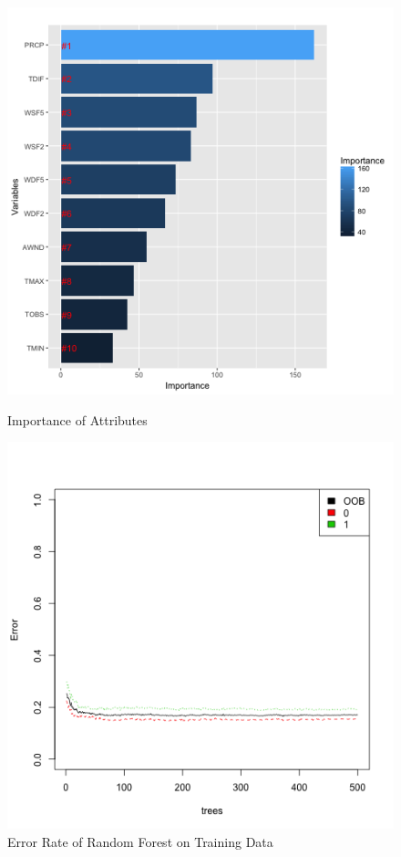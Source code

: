 \begin{figure}[h]
\centering
\begin{minipage}[t]{0.48\textwidth}
\centering
\includegraphics[width = .99\textwidth]{vimp.png}
\caption{Importance of Attributes}
\label{vimp}
\end{minipage}
\begin{minipage}[t]{0.48\textwidth}
\centering
\includegraphics[width = .99\textwidth]{errf.png}
\caption{Error Rate of Random Forest on Training Data}
\label{errf}
\end{minipage}
\end{figure}

